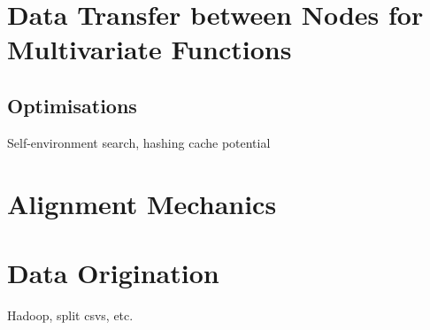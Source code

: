 \documentclass[a4paper,10pt]{article}
\begin{document}
\section{Data Transfer between Nodes for Multivariate Functions}
\subsection{Optimisations}
Self-environment search, hashing cache potential
\section{Alignment Mechanics}
\section{Data Origination}
Hadoop, split csvs, etc.

\printbibliography


















\end{document}

